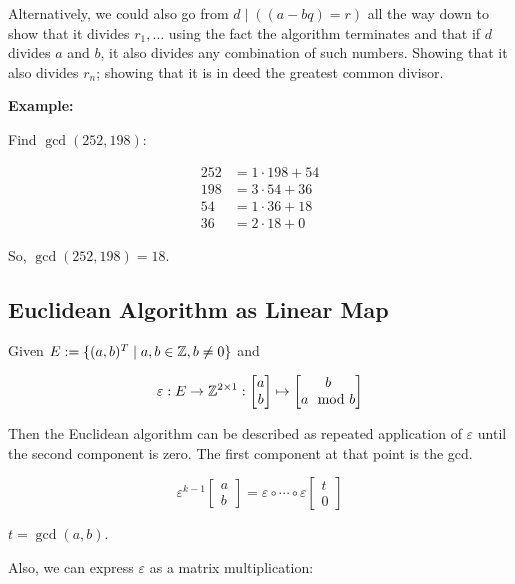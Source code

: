 \QED

Alternatively, we could also go from \(d \mid ((a - bq) = r)\) all the way down to show that it divides \(r_1, \dots\) using
the fact the algorithm terminates and that if \(d\) divides \(a\) and \(b\), it also divides any combination of such numbers.
Showing that it also divides \(r_n\); showing that it is in deed the greatest common divisor.

\QED

\textbf{Example:}

Find \(\gcd(252, 198)\):

\begin{align*}
	252 & = 1 \cdot 198 + 54 \\
	198 & = 3 \cdot 54 + 36  \\
	54  & = 1 \cdot 36 + 18  \\
	36  & = 2 \cdot 18 + 0
\end{align*}

So, \(\gcd(252, 198) = 18\).

\subsection{Euclidean Algorithm as Linear Map}

Given \(E := \{(a,b)^T \mid a, b \in \mathbb{Z}, b \ne 0 \}\) and

\[
	\varepsilon: E \to \mathbb{Z}^{2 \times 1} :
	\begin{bmatrix}
		a \\
		b
	\end{bmatrix}
	\mapsto
	\begin{bmatrix}
		b \\
		a \mod b
	\end{bmatrix}
\]

Then the Euclidean algorithm can be described as repeated application of \(\varepsilon\) until the second
component is zero. The first component at that point is the gcd.

\[
	\varepsilon^{k - 1}
	\begin{bmatrix}
		a \\
		b
	\end{bmatrix}
	= \varepsilon \circ \cdots \circ \varepsilon
	\begin{bmatrix}
		t \\
		0
	\end{bmatrix}
\]

\(t = \gcd(a,b)\).

Also, we can express \(\varepsilon\) as a matrix multiplication:

